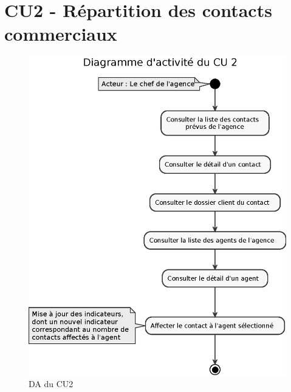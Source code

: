 \clearpage
\section{CU2 - Répartition des contacts commerciaux}

\begin{figure}[H]
\centering
\includegraphics[width=\textwidth]{figures/eps/DA_CU2.eps}
\caption{DA du CU2}
\end{figure}


